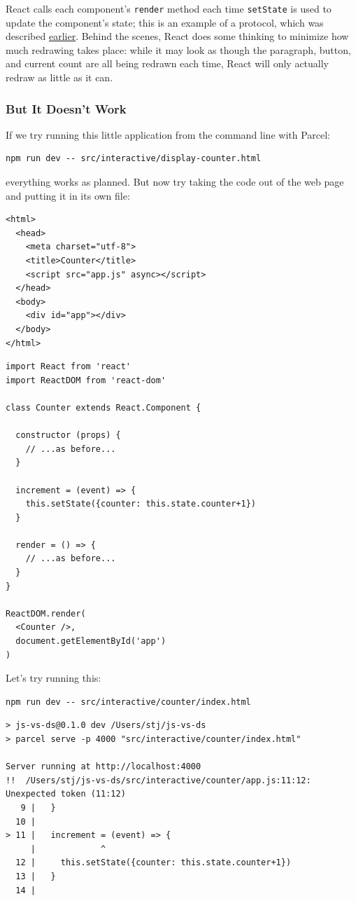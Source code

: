 React calls each component's \texttt{render} method each time
\texttt{setState} is used to update the component's state; this is an
example of a protocol, which was described
\protect\hyperlink{s:oop-protocols}{earlier}. Behind the scenes, React
does some thinking to minimize how much redrawing takes place: while it
may look as though the paragraph, button, and current count are all
being redrawn each time, React will only actually redraw as little as it
can.

\subsubsection{But It Doesn't Work}\label{s:interactive-babel}

If we try running this little application from the command line with
Parcel:

\begin{verbatim}
npm run dev -- src/interactive/display-counter.html
\end{verbatim}

everything works as planned. But now try taking the code out of the web
page and putting it in its own file:

\begin{verbatim}
<html>
  <head>
    <meta charset="utf-8">
    <title>Counter</title>
    <script src="app.js" async></script>
  </head>
  <body>
    <div id="app"></div>
  </body>
</html>
\end{verbatim}

\begin{verbatim}
import React from 'react'
import ReactDOM from 'react-dom'

class Counter extends React.Component {

  constructor (props) {
    // ...as before...
  }

  increment = (event) => {
    this.setState({counter: this.state.counter+1})
  }

  render = () => {
    // ...as before...
  }
}

ReactDOM.render(
  <Counter />,
  document.getElementById('app')
)
\end{verbatim}

Let's try running this:

\begin{verbatim}
npm run dev -- src/interactive/counter/index.html
\end{verbatim}

\begin{verbatim}
> js-vs-ds@0.1.0 dev /Users/stj/js-vs-ds
> parcel serve -p 4000 "src/interactive/counter/index.html"

Server running at http://localhost:4000
!!  /Users/stj/js-vs-ds/src/interactive/counter/app.js:11:12: Unexpected token (11:12)
   9 |   }
  10 |
> 11 |   increment = (event) => {
     |             ^
  12 |     this.setState({counter: this.state.counter+1})
  13 |   }
  14 |
\end{verbatim}


